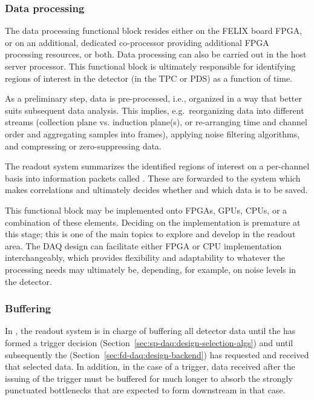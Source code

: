 \subsubsection{Data processing}

The data processing functional block resides either on the FELIX board FPGA, or on
an additional, dedicated co-processor providing additional FPGA
processing resources, or both. Data processing can also be carried out in the host
server processor. This functional block is ultimately
responsible for identifying regions of interest in the
detector (in the TPC or PDS) as a function of time.

As a preliminary step, data is pre-processed, i.e., organized in a way
that better suits subsequent data analysis. This implies, e.g.~reorganizing
data into different streams (collection plane vs. induction plane(s),
or re-arranging time and channel order and aggregating samples into frames), applying noise filtering algorithms, and compressing or zero-suppressing data.

The readout system summarizes the identified regions of interest
on a per-channel basis into information packets
called .  These are forwarded to the
 system which makes correlations and ultimately decides whether and which data is to be saved.

This functional block may be implemented onto FPGAs, GPUs, CPUs, or a
combination of these elements. Deciding on the implementation is
premature at this stage; this is one of the main topics to explore and
develop in the readout area. The DAQ design can facilitate either FPGA or
CPU implementation interchangeably, which provides flexibility and
adaptability to whatever the processing needs may ultimately be,
depending, for example, on noise levels in the detector.

\subsubsection{Buffering}

In , the readout system is in charge of buffering all
detector data until the  has formed a trigger decision
(Section~\ref{sec:sp-daq:design-selection-algs}) and until subsequently the
 (Section~\ref{sec:fd-daq:design-backend}) has requested and received that selected data. 
In addition, in the case of a  trigger, data received after
the issuing of the trigger must be buffered for much longer to absorb the
strongly punctuated bottlenecks that are expected to form downstream in that case.

